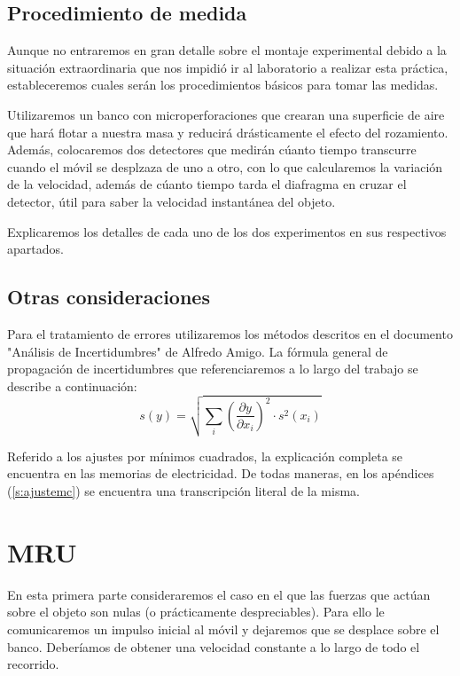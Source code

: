 \documentclass[12pt, a4paper, titlepage]{article}
\begin{document}
  \subsection{Procedimiento de medida}

  Aunque no entraremos en gran detalle sobre el montaje experimental debido a la situación extraordinaria que nos impidió ir al laboratorio a realizar esta práctica, estableceremos cuales serán los procedimientos básicos para tomar las medidas.

  Utilizaremos un banco con microperforaciones que crearan una superficie de aire que hará flotar a nuestra masa y reducirá drásticamente el efecto del rozamiento. Además, colocaremos dos detectores que medirán cúanto tiempo transcurre cuando el móvil se desplzaza de uno a otro, con lo que calcularemos la variación de la velocidad, además de cúanto tiempo tarda el diafragma en cruzar el detector, útil para saber la velocidad instantánea del objeto.

  Explicaremos los detalles de cada uno de los dos experimentos en sus respectivos apartados.

  \subsection{Otras consideraciones}

  Para el tratamiento de errores utilizaremos los métodos descritos en el documento "Análisis de Incertidumbres" de Alfredo Amigo. La fórmula general de propagación de incertidumbres que referenciaremos a lo largo del trabajo se describe a continuación:
  \begin{equation}
    s(y) = \sqrt{\sum_i{\left( \frac{\partial y}{\partial x_i} \right)^2 \cdot s^2(x_i)}} \label{ec:sy}
  \end{equation}

  Referido a los ajustes por mínimos cuadrados, la explicación completa se encuentra en las memorias de electricidad. De todas maneras, en los apéndices (\ref{s:ajustemc}) se encuentra una transcripción literal de la misma.

  \newpage
  \section{MRU}

  En esta primera parte consideraremos el caso en el que las fuerzas que actúan sobre el objeto son nulas (o prácticamente despreciables). Para ello le comunicaremos un impulso inicial al móvil y dejaremos que se desplace sobre el banco. Deberíamos de obtener una velocidad constante a lo largo de todo el recorrido.
\end{document}
